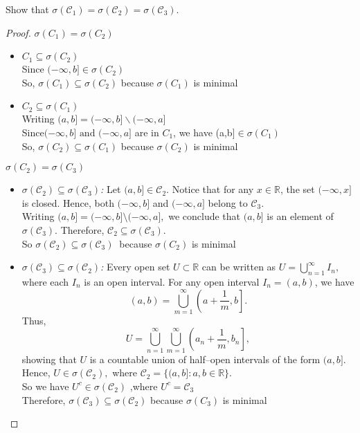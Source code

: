 \documentclass[letterpaper, 11pt]{article}
\newcommand{\1}{\mathds{1}}	%
\theoremstyle{definition}
\begin{document}
Show that $\sigma(\mathcal{C}_1) = \sigma(\mathcal{C}_2) = \sigma(\mathcal{C}_3)$.
\begin{proof}
    $ \sigma(C_1)=\sigma(C_2) $ 
    \begin{itemize}
    \item $ C_1\subseteq \sigma(C_2) $ \\Since $(-\infty,b]\in \sigma(C_2)$\\So, $\sigma(C_1)\subseteq\sigma(C_2)$ because $ \sigma(C_1) $ is minimal
    \item $ C_2\subseteq \sigma(C_1) $ 
    \\Writing $ (a,b]=(-\infty,b]\backslash(-\infty ,a]$ \\Since$  (-\infty,b]\text{ and }(-\infty ,a] $ are in $ C_1 $, we have (a,b]$\in \sigma(C_1) $\\So, $ \sigma(C_2)\subseteq\sigma(C_1)$ because $ \sigma(C_2) $ is minimal 
    \end{itemize}
    $ \sigma(C_2)=\sigma(C_3) $ 
      
  \begin{itemize}
    \item \emph{\(\sigma( \mathcal{C}_2)\subseteq \sigma(\mathcal{C}_3)\):}  
    Let \((a,b] \in \mathcal{C}_2\). Notice that for any \(x\in\mathbb{R}\), the set \((-\infty,x]\) is closed. Hence, both \((-\infty,b]\) and \((-\infty,a]\) belong to \(\mathcal{C}_3\). 
    \\Writing
    $(a,b] = (-\infty,b] \setminus (-\infty,a],$
    we conclude that \((a,b]\) is an element of \(\sigma(\mathcal{C}_3)\). Therefore, 
    $\mathcal{C}_2 \subseteq \sigma(\mathcal{C}_3).$ 
    \\So $ \sigma( \mathcal{C}_2)\subseteq \sigma(\mathcal{C}_3)\ $ because $ \sigma(C_2) $ is minimal
    \item\emph{\( \sigma(\mathcal{C}_3) \subseteq \sigma(\mathcal{C}_2)\):}  
    Every open set \( U \subset \mathbb{R} \) can be written as
$
U = \bigcup_{n=1}^\infty I_n,
$
\\where each \( I_n \) is an open interval. For any open interval \( I_n = (a,b) \), we have
\[
(a,b) = \bigcup_{m=1}^\infty \left(a+\frac{1}{m}, b\right].
\]
Thus,
\[
U = \bigcup_{n=1}^\infty \bigcup_{m=1}^\infty \left(a_n+\frac{1}{m}, b_n\right],
\]
showing that \( U \) is a countable union of half–open intervals of the form \((a,b]\). \\Hence,
$
U \in \sigma(\mathcal{C}_2),
$
where 
$
\mathcal{C}_2 = \{ (a,b] : a,b \in \mathbb{R} \}.
$
\\So we have $ U^c\in \sigma(\mathcal{C}_2)$ ,where $ U^c= \mathcal{C}_3$ \\
Therefore, \( \sigma(\mathcal{C}_3) \subseteq \sigma(\mathcal{C}_2) \) because $ \sigma(C_3) $ is minimal

\end{itemize}
\end{proof}
\end{document}
